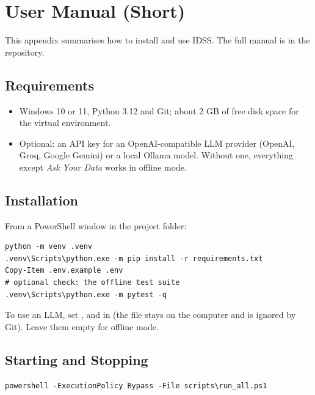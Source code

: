 \chapter{User Manual (Short)}\label{ch:A}

This appendix summarises how to install and use IDSS. The full manual is  in the repository.

\FloatBarrier
\section{Requirements}\label{sec:A.1}

\begin{itemize}
  \item Windows 10 or 11, Python 3.12 and Git; about 2 GB of free disk space for the virtual environment.
  \item Optional: an API key for an OpenAI-compatible LLM provider (OpenAI, Groq, Google Gemini) or a local Ollama model. Without one, everything except \textit{Ask Your Data} works in offline mode.
\end{itemize}

\FloatBarrier
\section{Installation}\label{sec:A.2}

From a PowerShell window in the project folder:

\begin{lstlisting}
python -m venv .venv
.venv\Scripts\python.exe -m pip install -r requirements.txt
Copy-Item .env.example .env
# optional check: the offline test suite
.venv\Scripts\python.exe -m pytest -q
\end{lstlisting}

To use an LLM, set ,  and  in  (the file stays on the computer and is ignored by Git). Leave them empty for offline mode.

\FloatBarrier
\section{Starting and Stopping}\label{sec:A.3}

\begin{lstlisting}
powershell -ExecutionPolicy Bypass -File scripts\run_all.ps1
\end{lstlisting}

